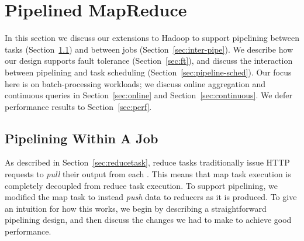 \section{Pipelined MapReduce}
\label{sec:pipelining}

In this section we discuss our extensions to Hadoop to support pipelining
between tasks (Section~\ref{sec:intra-pipe}) and between jobs
(Section~\ref{sec:inter-pipe}).  We describe how our design supports fault
tolerance (Section~\ref{sec:ft}), and discuss the interaction between pipelining
and task scheduling (Section~\ref{sec:pipeline-sched}).  Our focus here is on
batch-processing workloads; we discuss online aggregation and continuous queries
in Section~\ref{sec:online} and Section~\ref{sec:continuous}. We defer
performance results to Section~\ref{sec:perf}.


\subsection{Pipelining Within A Job}
\label{sec:intra-pipe}
As described in Section~\ref{sec:reducetask}, reduce tasks
traditionally issue HTTP requests to \emph{pull} their output from
each {\TT}. This means that map task execution is completely decoupled
from reduce task execution. To support pipelining, we modified the map
task to instead \emph{push} data to reducers as it is produced. To
give an intuition for how this works, we begin by describing a
straightforward pipelining design, and then discuss the changes we
had to make to achieve good performance.

